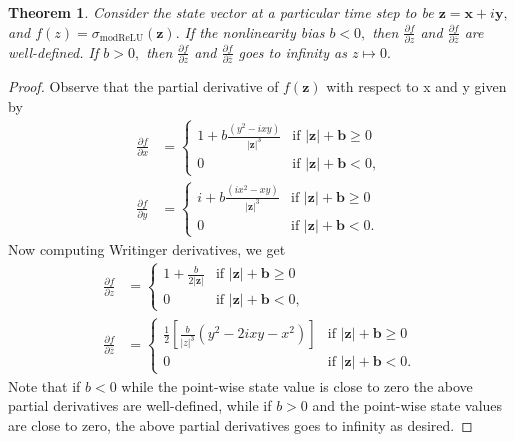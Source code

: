 \documentclass[letterpaper]{article} %
\newtheorem{theorem}{Theorem}
\begin{document}
\begin{theorem}
Consider the state vector at a particular time step to be $\textbf{z} = \textbf{x} +i\textbf{y},$ and $f(z) = \sigma_{\text{modReLU}}(\textbf{z}).$ If the nonlinearity bias $b < 0,$ then $\frac{\partial f}{\partial z}$ and $\frac{\partial f}{\partial \overline{z}}$ are well-defined. If $b >0,$ then $\frac{\partial f}{\partial z}$ and $\frac{\partial f}{\partial \overline{z}}$ goes to infinity as $z \mapsto 0.$
\end{theorem}

\begin{proof}
Observe that the partial derivative of $f(\textbf{z})$ with respect to x and y given by
\begin{align*}
\frac{\partial f}{\partial x} &=\begin{cases} 
      1 + b \frac{(y^2 -ixy)}{|\textbf{z}|^3} & \text{if } |\textbf{z}|+\textbf{b} \geq 0 \\
      0 & \text{if } |\textbf{z}|+\textbf{b} < 0,
   \end{cases} \\
\frac{\partial f}{\partial y}  &= \begin{cases} 
      i + b \frac{(i x^2 -xy)}{|\textbf{z}|^3} & \text{if } |\textbf{z}|+\textbf{b} \geq 0 \\
      0 & \text{if } |\textbf{z}|+\textbf{b} < 0.
   \end{cases}
\end{align*}
Now computing Writinger derivatives, we get
\begin{align*}
\frac{\partial f}{\partial z} &=\begin{cases} 
      1 + \frac{b}{2|\textbf{z}|} & \text{if } |\textbf{z}|+\textbf{b} \geq 0 \\
      0 & \text{if } |\textbf{z}|+\textbf{b} < 0,
   \end{cases} \\
\frac{\partial f}{\partial \overline{z}}  &= \begin{cases} 
      \frac{1}{2}\left[ \frac{b}{|z|^3}\left( y^2 -2ixy -x^2 \right) \right] & \text{if } |\textbf{z}|+\textbf{b} \geq 0 \\
      0 & \text{if } |\textbf{z}|+\textbf{b} < 0.
   \end{cases}
\end{align*}
Note that if $b <0$ while the point-wise state value is close to zero the above partial derivatives are well-defined, while if $b >0$ and the point-wise state values are close to zero, the above partial derivatives goes to infinity as desired. 
\end{proof}
\end{document}
